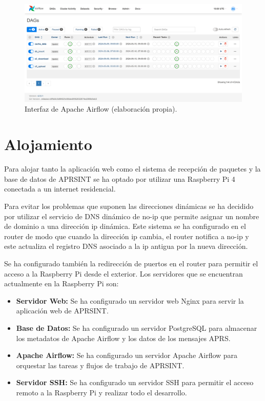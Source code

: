 \begin{figure}[h]
	\centering
	\includegraphics[width=1\textwidth]{Imagenes/Chapter_4/airflow_dashboard.png}
	\caption[Interfaz de Apache Airflow.]{Interfaz de Apache Airflow (elaboración propia).}
	\label{fig:airflow-dashboard}
\end{figure}

\section{Alojamiento}
Para alojar tanto la aplicación web como el sistema de recepción de paquetes y la base de datos de APRSINT se ha optado por utilizar una Raspberry Pi 4 conectada a un internet residencial.

Para evitar los problemas que suponen las direcciones dinámicas se ha decidido por utilizar el servicio de DNS dinámico de no-ip que permite asignar un nombre de dominio a una dirección ip dinámica. Este sistema se ha configurado en el router de modo que cuando la dirección ip cambia, el router notifica a no-ip y este actualiza el registro DNS asociado a la ip antigua por la nueva dirección.

Se ha configurado también la redirección de puertos en el router para permitir el acceso a la Raspberry Pi desde el exterior. Los servidores que se encuentran actualmente en la Raspberry Pi son:
\begin{itemize}
	\item \textbf{Servidor Web:} Se ha configurado un servidor web Nginx para servir la aplicación web de APRSINT.
	\item \textbf{Base de Datos:} Se ha configurado un servidor PostgreSQL para almacenar los metadatos de Apache Airflow y los datos de los mensajes APRS.
	\item \textbf{Apache Airflow:} Se ha configurado un servidor Apache Airflow para orquestar las tareas y flujos de trabajo de APRSINT.
	\item \textbf{Servidor SSH:} Se ha configurado un servidor SSH para permitir el acceso remoto a la Raspberry Pi y realizar todo el desarrollo.
\end{itemize}


